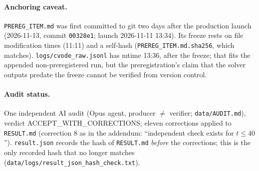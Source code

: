 \documentclass[11pt]{article}
\theoremstyle{remark}
\begin{document}
\paragraph{Anchoring caveat.} \texttt{PREREG\_ITEM.md} was first committed to git two days after the production launch (2026-11-13, commit \texttt{00328e1}; launch 2026-11-11 13:34). Its freeze rests on file modification times (11:11) and a self-hash (\texttt{PREREG\_ITEM.md.sha256}, which matches). \texttt{logs/cvode\_raw.jsonl} has mtime 13:36, after the freeze; that fits the appended non-preregistered run, but the preregistration's claim that the solver outputs predate the freeze cannot be verified from version control.
\paragraph{Audit status.} One independent AI audit (Opus agent, producer $\ne$ verifier; \texttt{data/AUDIT.md}), verdict ACCEPT\_WITH\_CORRECTIONS; eleven corrections applied to \texttt{RESULT.md} (correction 8 as in the addendum: ``independent check exists for $t\le40$''). \texttt{result.json} records the hash of \texttt{RESULT.md} \emph{before} the corrections; this is the only recorded hash that no longer matches (\texttt{data/logs/result\_json\_hash\_check.txt}).

\end{document}
